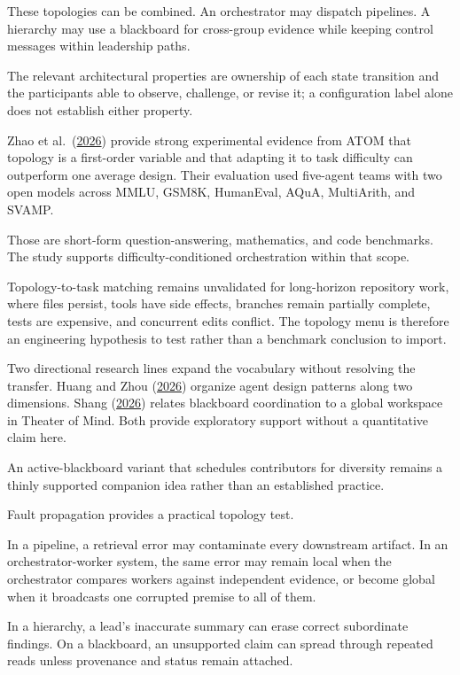 These topologies can be combined. An orchestrator may dispatch pipelines. A hierarchy may use a blackboard for cross-group evidence while keeping control messages within leadership paths.

The relevant architectural properties are ownership of each state transition and the participants able to observe, challenge, or revise it; a configuration label alone does not establish either property.

Zhao et al.~(\href{https://arxiv.org/abs/2605.26178}{2026}) provide strong experimental evidence from ATOM that topology is a first-order variable and that adapting it to task difficulty can outperform one average design. Their evaluation used five-agent teams with two open models across MMLU, GSM8K, HumanEval, AQuA, MultiArith, and SVAMP.

Those are short-form question-answering, mathematics, and code benchmarks. The study supports difficulty-conditioned orchestration within that scope.

Topology-to-task matching remains unvalidated for long-horizon repository work, where files persist, tools have side effects, branches remain partially complete, tests are expensive, and concurrent edits conflict. The topology menu is therefore an engineering hypothesis to test rather than a benchmark conclusion to import.

Two directional research lines expand the vocabulary without resolving the transfer. Huang and Zhou (\href{https://arxiv.org/abs/2605.13850}{2026}) organize agent design patterns along two dimensions. Shang (\href{https://arxiv.org/abs/2604.08206}{2026}) relates blackboard coordination to a global workspace in Theater of Mind. Both provide exploratory support without a quantitative claim here.

An active-blackboard variant that schedules contributors for diversity remains a thinly supported companion idea rather than an established practice.

Fault propagation provides a practical topology test.

In a pipeline, a retrieval error may contaminate every downstream artifact. In an orchestrator-worker system, the same error may remain local when the orchestrator compares workers against independent evidence, or become global when it broadcasts one corrupted premise to all of them.

In a hierarchy, a lead's inaccurate summary can erase correct subordinate findings. On a blackboard, an unsupported claim can spread through repeated reads unless provenance and status remain attached.

